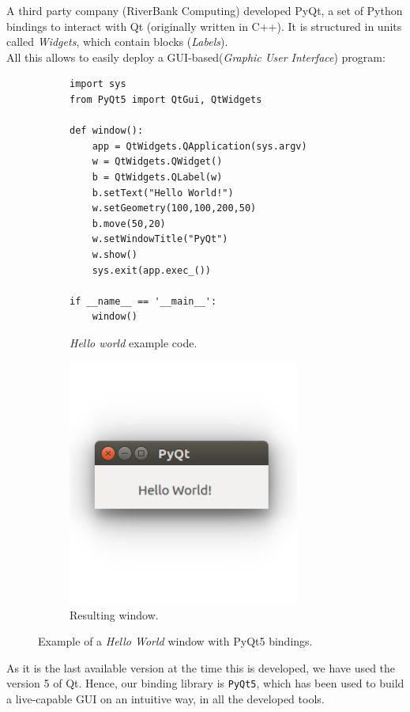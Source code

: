 	A third party company (RiverBank Computing) developed PyQt, a set of Python bindings to interact with Qt (originally written in C++). It is structured in units called \emph{Widgets}, which contain blocks (\emph{Labels}).\\
	
	All this allows to easily deploy a GUI-based(\emph{Graphic User Interface}) program:
	\begin{figure}[h]
		\centering
		\begin{subfigure}[h]{0.55\linewidth}
			\centering
			\begin{lstlisting}
import sys
from PyQt5 import QtGui, QtWidgets

def window():
	app = QtWidgets.QApplication(sys.argv)
	w = QtWidgets.QWidget()
	b = QtWidgets.QLabel(w)
	b.setText("Hello World!")
	w.setGeometry(100,100,200,50)
	b.move(50,20)
	w.setWindowTitle("PyQt")
	w.show()
	sys.exit(app.exec_())

if __name__ == '__main__':
	window()
			\end{lstlisting}
			\caption{\emph{Hello world} example code.}
		\end{subfigure}
		\qquad
		\begin{subfigure}[h]{0.35\linewidth}
			\centering
			\includegraphics[width=3in]{images/pyqt_helloworld}
			\caption{Resulting window.}
		\end{subfigure}
		\caption{Example of a \emph{Hello World} window with PyQt5 bindings.}
		\label{fig:3_pyqt_helloworld}
	\end{figure}
	
	As it is the last available version at the time this is developed, we have used the version 5 of Qt. Hence, our binding library is \texttt{PyQt5}, which has been used to build a live-capable GUI on an intuitive way, in all the developed tools.\\
	
